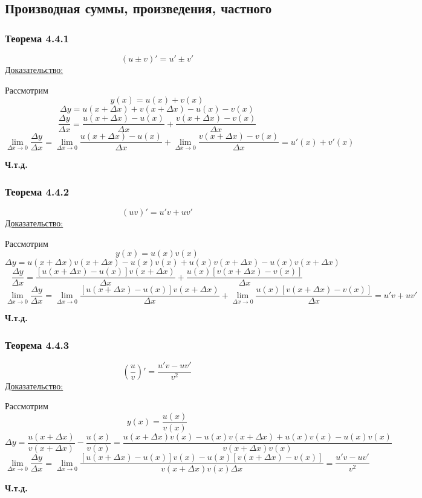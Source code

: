 \documentclass[12pt]{article}
\begin{document}
    \subsection{Производная суммы, произведения, частного}
    \subsubsection*{Теорема 4.4.1}\label{th:4.4.1}
    \[ (u \pm v)' = u' \pm v' \]
    \noindent\underline{Доказательство:}
    \begin{adjustwidth}{1.5em}{1.5em}
        Рассмотрим \[y(x) = u(x) + v(x)\]
        \[\Delta y = u(x + \Delta x) + v(x + \Delta x) - u(x) - v(x)\]
        \[\frac{\Delta y}{\Delta x} = \frac{u(x+\Delta x) - u(x)}{\Delta x} + \frac{v(x + \Delta x) - v(x)}{\Delta x}\]
        \[ \lim_{\Delta x \to 0} \frac{\Delta y}{\Delta x} = \lim_{\Delta x \to 0}\frac{u(x+\Delta x) - u(x)}{\Delta x} + \lim_{\Delta x \to 0}\frac{v(x + \Delta x) - v(x)}{\Delta x} = u'(x) + v'(x)\]
        \begin{center}
            \textbf{Ч.т.д.}
        \end{center}
    \end{adjustwidth}
    \subsubsection*{Теорема 4.4.2}\label{th:4.4.2}
    \[ (uv)' = u'v + uv' \]
    \underline{Доказательство:}
    \begin{adjustwidth}{1.5em}{1.5em}
        Рассмотрим \[ y(x) = u(x)v(x) \]
        \[ \Delta y = u(x+\Delta x)v(x+\Delta x) - u(x)v(x) + u(x)v(x + \Delta x) - u(x)v(x + \Delta x) \]
        \[ \frac{\Delta y}{\Delta x} = \frac{[u(x+\Delta x) - u(x)]v(x+\Delta x)}{\Delta x} + \frac{u(x)[v(x+\Delta x)-v(x)]}{\Delta x} \]
        \[ \lim_{\Delta x \to 0}\frac{\Delta y}{\Delta x} = \lim_{\Delta x \to 0}\frac{[u(x+\Delta x) - u(x)]v(x+\Delta x)}{\Delta x} + \lim_{\Delta x \to 0}\frac{u(x)[v(x+\Delta x)-v(x)]}{\Delta x} = u'v + uv' \]
        \begin{center}
            \textbf{Ч.т.д.}
        \end{center}
    \end{adjustwidth}

    \subsubsection*{Теорема 4.4.3}\label{th:4.4.3}
    \[ \left(\frac{u}{v}\right)' = \frac{u'v - uv'}{v^2} \]
    \underline{Доказательство:}
    \begin{adjustwidth}{1.5em}{1.5em}
        Рассмотрим \[ y(x) = \frac{u(x)}{v(x)} \]
        \[ \Delta y = \frac{u(x + \Delta x)}{v(x + \Delta x)} - \frac{u(x)}{v(x)} = \frac{u(x + \Delta x)v(x) - u(x)v(x+\Delta x) + u(x)v(x) - u(x)v(x)}{v(x+\Delta x)v(x)} \]
        \[ \lim_{\Delta x \to 0}\frac{\Delta y}{\Delta x} = \lim_{\Delta x \to 0} \frac{[u(x + \Delta x) - u(x)]v(x) - u(x)[v(x+\Delta x) - v(x)]}{v(x+\Delta x)v(x)\Delta x} = \frac{u'v - uv'}{v^2} \]
        \begin{center}
            \textbf{Ч.т.д.}
        \end{center}
    \end{adjustwidth}
\end{document}
